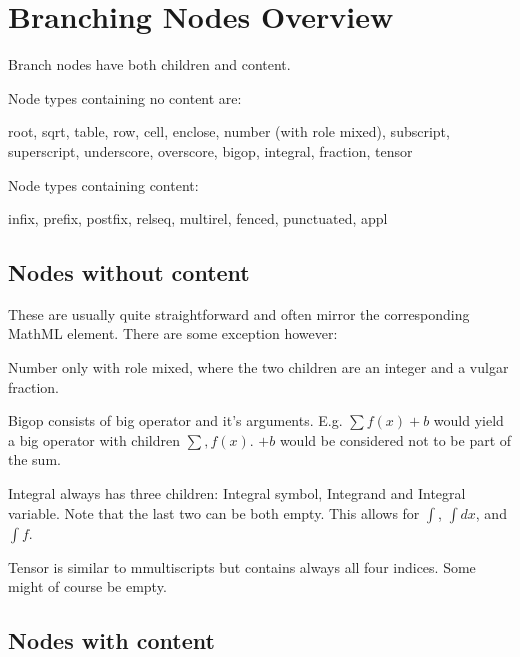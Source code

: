 \documentclass{article}
\begin{document}
\section{Branching Nodes Overview}
\label{sec:branching-nodes-overview}

Branch nodes have both children and content. 

Node types containing no content are: 

root, sqrt, table, row, cell, enclose, number (with role mixed), subscript,
superscript, underscore, overscore, bigop, integral, fraction, tensor

Node types containing content: 

infix, prefix, postfix, relseq, multirel, fenced, punctuated, appl

\subsection{Nodes without content}

These are usually quite straightforward and often mirror the corresponding
MathML element. There are some exception however: 

Number only with role mixed, where the two children are an integer and a vulgar
fraction.

Bigop consists of big operator and it's arguments. E.g. $\sum f(x) + b$ would
yield a big operator with children $\sum, f(x)$. $+ b$ would be considered not
to be part of the sum.

Integral always has three children: Integral symbol, Integrand and Integral
variable. Note that the last two can be both empty. This allows for $\int$,
$\int dx$, and $\int f$.

Tensor is similar to mmultiscripts but contains always all four indices.  Some
might of course be empty.

\subsection{Nodes with content}
\end{document}
